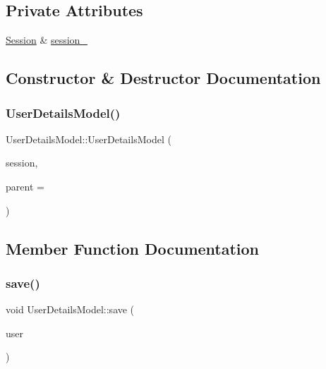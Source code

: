 \subsection*{Private Attributes}
\begin{DoxyCompactItemize}
\item 
\hyperlink{class_session}{Session} \& \hyperlink{class_user_details_model_a97ed29b3f1835399da3765b50f397d5f}{session\+\_\+}
\end{DoxyCompactItemize}


\subsection{Constructor \& Destructor Documentation}
\mbox{\label{class_user_details_model_aac16af78a18e4a99a6666d85914af5d5}} 
\subsubsection{\texorpdfstring{User\+Details\+Model()}{UserDetailsModel()}}
{\footnotesize\ttfamily User\+Details\+Model\+::\+User\+Details\+Model (\begin{DoxyParamCaption}\item[{\hyperlink{class_session}{Session} \&}]{session,  }\item[{Wt\+::\+W\+Object $\ast$}]{parent = {} }\end{DoxyParamCaption})}



\subsection{Member Function Documentation}
\mbox{\label{class_user_details_model_a0216d9fc37c8528a5fd49756529d4f57}} 
\subsubsection{\texorpdfstring{save()}{save()}}
{\footnotesize\ttfamily void User\+Details\+Model\+::save (\begin{DoxyParamCaption}\item[{const Wt\+::\+Auth\+::\+User \&}]{user }\end{DoxyParamCaption})}



